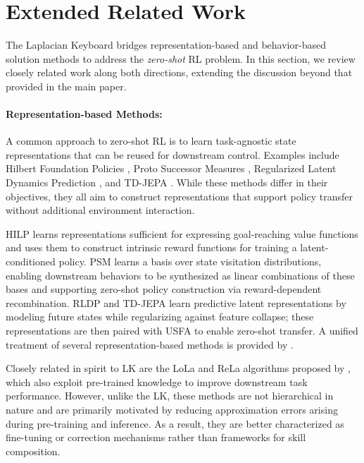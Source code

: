 \documentclass{article}
\theoremstyle{plain}
\theoremstyle{definition}
\theoremstyle{remark}
\begin{document}
\newpage
\appendix
\onecolumn

\section{Extended Related Work}
\label{sec:extended-related-work}

The Laplacian Keyboard bridges representation-based and behavior-based solution methods to address the \textit{zero-shot} RL problem. In this section, we review closely related work along both directions, extending the discussion beyond that provided in the main paper. 

\paragraph{Representation-based Methods:}
A common approach to zero-shot RL is to learn task-agnostic state representations that can be reused for downstream control. Examples include Hilbert Foundation Policies \citep[HILP;][]{park2024hilp}, Proto Successor Measures \citep[PSM;][]{agarwal2025proto}, Regularized Latent Dynamics Prediction \citep[RLDP;][]{jajoo2025regularized}, and TD-JEPA \citep{bagatella2025tdjepa}. While these methods differ in their objectives, they all aim to construct representations that support policy transfer without additional environment interaction.

HILP learns representations sufficient for expressing goal-reaching value functions and uses them to construct intrinsic reward functions for training a latent-conditioned policy. PSM learns a basis over state visitation distributions, enabling downstream behaviors to be synthesized as linear combinations of these bases and supporting zero-shot policy construction via reward-dependent recombination. RLDP and TD-JEPA learn predictive latent representations by modeling future states while regularizing against feature collapse; these representations are then paired with USFA to enable zero-shot transfer. A unified treatment of several representation-based methods is provided by \citet{agarwal2025unified}.

Closely related in spirit to LK are the LoLa and ReLa algorithms proposed by \citet{sikchi2025fast}, which also exploit pre-trained knowledge to improve downstream task performance. However, unlike the LK, these methods are not hierarchical in nature and are primarily motivated by reducing approximation errors arising during pre-training and inference. As a result, they are better characterized as fine-tuning or correction mechanisms rather than frameworks for skill composition.
\end{document}
